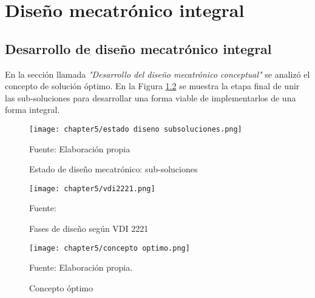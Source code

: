 
\pagestyle{myportland}
\doublespacing
\chapter[----- Diseño mecatrónico integral]{Diseño mecatrónico integral}
\thispagestyle{myportland}


\section{Desarrollo de diseño mecatrónico integral}

En la sección llamada \textit{"Desarrollo del diseño mecatrónico conceptual"} \cite{DiazVergara2020} se analizó el concepto de solución óptimo. En la Figura \ref{fig:estado diseno mecatronico etapa 3} se muestra la etapa final de unir las sub-soluciones para desarrollar una forma viable de implementarlos de una forma integral.

\begin{figure}[H]
	\centering
	\texttt{[image: chapter5/estado diseno subsoluciones.png]}
	\caption{Estado de diseño mecatrónico: sub-soluciones}
	\begin{myflushleftportland}
		Fuente: Elaboración propia
	\end{myflushleftportland}
	\label{fig:estado diseno mecatronico etapa 3}
\end{figure}

\begin{figure}[H]
	\centering
	\texttt{[image: chapter5/vdi2221.png]}
	\caption{Fases de diseño según VDI 2221}
	\begin{myflushleftportland}
		Fuente: \cite{Pahl2007}
	\end{myflushleftportland}
	\label{fig:estado diseno mecatronico etapa 3}
\end{figure}

\begin{figure}[H]
	\centering
	\texttt{[image: chapter5/concepto optimo.png]}
	\caption{Concepto óptimo}
	\begin{myflushleftportland}
		Fuente: Elaboración propia.
	\end{myflushleftportland}
	\label{fig:concepto optimo}
\end{figure}

